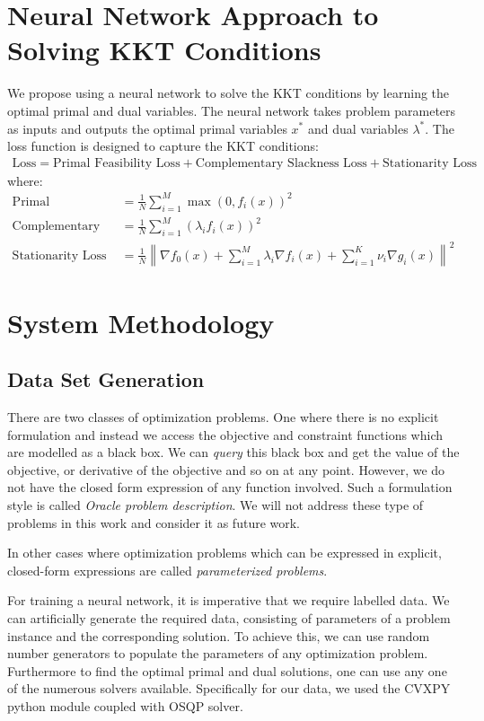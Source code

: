 \documentclass{article} %
\begin{document}
\section{Neural Network Approach to Solving KKT Conditions}

We propose using a neural network to solve the KKT conditions by learning the optimal primal and dual variables. The neural network takes problem parameters as inputs and outputs the optimal primal variables \( x^* \) and dual variables \( \lambda^* \). The loss function is designed to capture the KKT conditions:
\begin{align}
\text{Loss} = \text{Primal Feasibility Loss} + \text{Complementary Slackness Loss} + \text{Stationarity Loss}
\end{align}
where:
\begin{align}
\text{Primal Feasibility Loss} &= \frac{1}{N} \sum_{i=1}^{M} \max(0, f_i(x))^2 \\
\text{Complementary Slackness Loss} &= \frac{1}{N} \sum_{i=1}^{M} (\lambda_i f_i(x))^2 \\
\text{Stationarity Loss} &= \frac{1}{N} \left\| \nabla f_0(x) + \sum_{i=1}^{M} \lambda_i \nabla f_i(x) + \sum_{i=1}^{K} \nu_i \nabla g_i(x) \right\|^2
\end{align}

\section{System Methodology}

    \subsection{Data Set Generation}
    There are two classes of optimization problems. One where there is no explicit formulation and instead we access the objective and constraint functions which are modelled as a black box. We can \emph{query} this black box and get the value of the objective, or derivative of the objective and so on at any point. However, we do not have the closed form expression of any function involved. Such a formulation style is called \emph{Oracle problem description}. We will not address these type of problems in this work and consider it as future work.

    In other cases where optimization problems which can be expressed in explicit, closed-form expressions are called \emph{parameterized problems}. 

    For training a neural network, it is imperative that we require labelled data. We can artificially generate the required data, consisting of parameters of a problem instance and the corresponding solution. To achieve this, we can use random number generators to populate the parameters of any optimization problem. Furthermore to find the optimal primal and dual solutions, one can use any one of the numerous solvers available. Specifically for our data, we used the CVXPY python module coupled with OSQP solver. 
\end{document}
